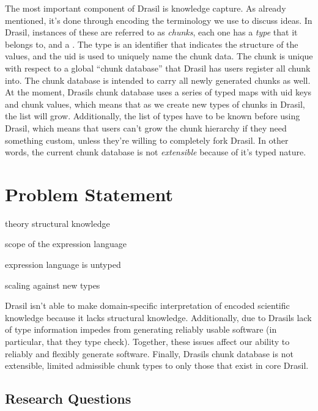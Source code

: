 The most important component of Drasil is knowledge capture. As already
mentioned, it's done through encoding the terminology we use to discuss ideas.
In Drasil, instances of these are referred to as \textit{chunks}, each one has a
\textit{type} that it belongs to, and a . The type is an identifier
that indicates the structure of the values, and the \acs{uid} is used to
uniquely name the chunk data. The chunk is unique with respect to a global
``chunk database'' that Drasil has users register all chunk into. The chunk
database is intended to carry all newly generated chunks as well. At the moment,
Drasils chunk database uses a series of typed maps with \acs{uid} keys and chunk
values, which means that as we create new types of chunks in Drasil, the list
will grow. Additionally, the list of types have to be known before using Drasil,
which means that users can't grow the chunk hierarchy if they need something
custom, unless they're willing to completely fork Drasil. In other words, the
current chunk database is not \textit{extensible} because of it's typed nature.

\section{Problem Statement}
\label{sec:intro:problemStatement}

\begin{writingdirectives}
      \item theory structural knowledge
      \item scope of the expression language
      \item expression language is untyped
      \item scaling against new types
\end{writingdirectives}

Drasil isn't able to make domain-specific interpretation of encoded scientific
knowledge because it lacks structural knowledge. Additionally, due to Drasils
lack of type information impedes from generating reliably usable software (in
particular, that they type check). Together, these issues affect our ability to
reliably and flexibly generate software. Finally, Drasils chunk database is not
extensible, limited admissible chunk types to only those that exist in core
Drasil.

\subsection{Research Questions}
\label{sec:intro:researchquestions}

